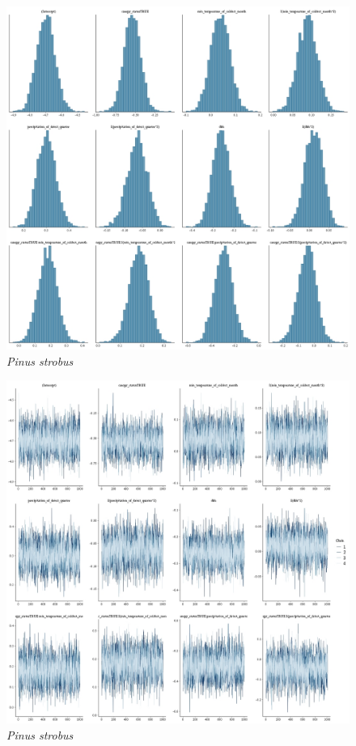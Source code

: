 \documentclass[letterpaper, 12pt]{article}
\begin{document}
\begin{figure}
	\centering
	\includegraphics[scale=0.4]{./183385-PIN-STR_hist}
	\caption{\textit{Pinus strobus}}
\end{figure}

\begin{figure}
	\centering
	\includegraphics[scale=0.4]{./183385-PIN-STR_traces}
	\caption{\textit{Pinus strobus}}
\end{figure}
\end{document}
